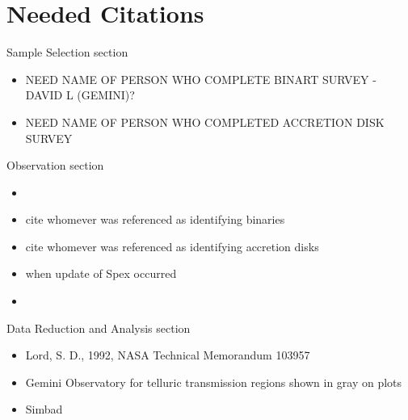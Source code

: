 \section{Needed Citations}

\begin{bf}Sample Selection section\end{bf}
	\begin{itemize}
		\item{} NEED NAME OF PERSON WHO COMPLETE BINART SURVEY - DAVID L (GEMINI)?
		\item{} NEED NAME OF PERSON WHO COMPLETED ACCRETION DISK SURVEY
\end{itemize}

\begin{bf}Observation section\end{bf}
	\begin{itemize}
		\item{} \cite{Rayner_2003}
		\item{} cite whomever was referenced as identifying binaries \cite{Adam_Krauss_or_other_paper}
		\item{} cite whomever was referenced as identifying accretion disks \cite{disk_guy}
		\item{} when update of Spex occurred \cite{Spex}\\
		\item{} \cite{2mass_catalog_for_j_mags}
	\end{itemize} 


\begin{bf}Data Reduction and Analysis section\end{bf}
	\begin{itemize}
		\item{} Lord, S. D., 1992, NASA Technical Memorandum 103957
		\item{} Gemini Observatory for telluric transmission regions shown in gray on plots
  		\item{} Simbad
  
	\end{itemize}